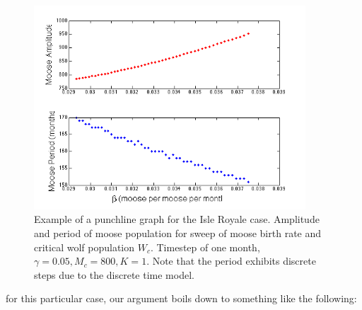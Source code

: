 \begin{figure}[h!]
\includegraphics[width=4in]{figs/MooseBCSweepClean}
\caption{Example of a punchline graph for the Isle Royale case.  Amplitude and period of moose population for sweep of moose birth rate and critical wolf population $W_c$.  Timestep of one month,  $\gamma = 0.05, M_c = 800, K=1$.  Note that the period exhibits discrete steps due to the discrete time model.}
\end{figure}

\clearpage

 for this particular case, our argument boils down to something like the following:

